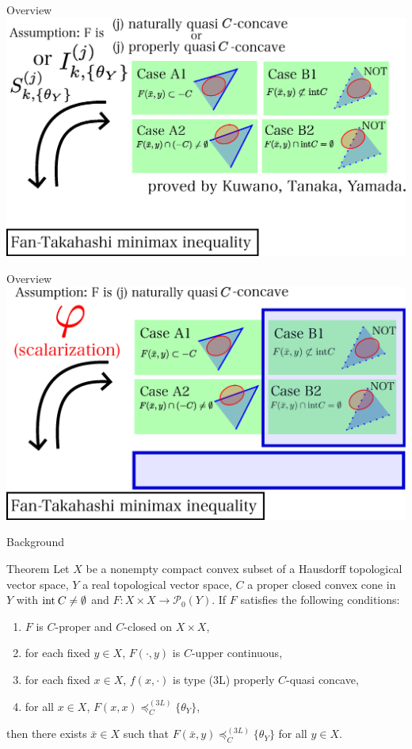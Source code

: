 \documentclass[aspectratio=169, dvipdfmx, 11pt]{beamer}
\newcommand{\Interior}[1]{\text{\rm int\:${#1}$}} %
\newcommand{\pow}[1]{\mathcal{P}_{0}(#1)}
\begin{document}
\begin{frame}{Overview}
  \centering
  \includegraphics[keepaspectratio, scale=0.38]{figures/eps/kuwano_tanaka_yamada_results.eps}
\end{frame}

\begin{frame}{Overview}
  \centering
  \includegraphics[keepaspectratio, scale=0.38]{figures/eps/iwamoto_tanaka_results.eps}
\end{frame}

\begin{frame}{Background}
  \begin{block}{Theorem \cite{MR2778674}}
    Let $X$ be a nonempty compact convex subset of a Hausdorff topological vector space,
    $Y$ a real topological vector space, $C$ a proper closed convex cone in $Y$ with $\Interior{C} \ne \emptyset$
    and $F\colon X \times X \to \pow{Y}$. If $F$ satisfies the following conditions:
    \begin{enumerate}
      \item $F$ is $C$-proper and $C$-closed on $X \times X$,
      \item for each fixed $y \in X$, $F(\cdot,y)$ is $C$-upper continuous,
      \item for each fixed $x \in X$, $f(x, \cdot)$ is type (3L) properly $C$-quasi concave,
      \item for all $x \in X$, $F(x,x) \preccurlyeq_{C}^{(3L)} \{\theta_{Y}\}$,
    \end{enumerate}
    then there exists $\bar{x} \in X$ such that $F(\bar{x},y) \preccurlyeq_{C}^{(3L)} \{\theta_{Y}\}$ for all $y \in X$.
  \end{block}
\end{frame}
\end{document}
